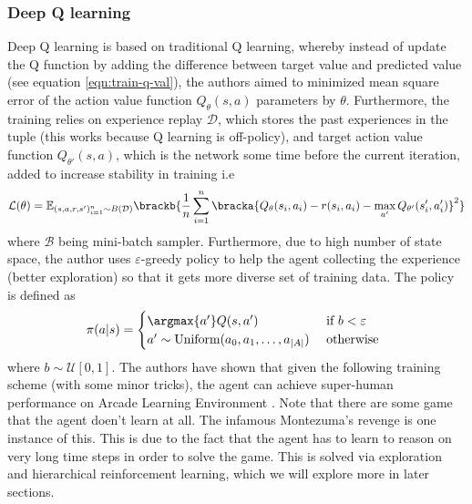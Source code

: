 \subsubsection{Deep Q learning \cite{mnih2015human}}
Deep Q learning is based on traditional Q learning, whereby instead of update the Q function by adding the difference between target value and predicted value (see equation \ref{eqn:train-q-val}), the authors aimed to minimized mean square error of the action value function $Q_\theta(s, a)$ parameters by $\theta$. Furthermore, the training relies on experience replay $\mathcal{D}$, which stores the past experiences in the tuple (this works because Q learning is off-policy), and target action value function $Q_{\theta'}(s, a)$, which is the network some time before the current iteration, added to increase stability in training i.e
\begin{equation}
    \mathcal{L}(\theta) = \mathbb{E}_{(s, a, r, s')^n_{i=1} \sim B(\mathcal{D})}\brackb{ \frac{1}{n}\sum^n_{i=1} \bracka{Q_{\theta}(s_i, a_i) - r(s_i, a_i) - \max_{a'} Q_{\theta'}(s'_i, a'_i)}^2 }
\end{equation}
where $\mathcal{B}$ being mini-batch sampler. Furthermore, due to high number of state space, the author uses $\varepsilon$-greedy policy to help the agent collecting the experience (better exploration) so that it gets more diverse set of training data. The policy is defined as 
\begin{equation}
    \pi(a | s) = \begin{cases}
        \argmax{a'} Q(s, a') &\text{ if } b < \varepsilon \\
        a' \sim \text{Uniform}(a_0, a_1, \dots, a_{|A|}) &\text{ otherwise } \\
    \end{cases} \\
\end{equation}
where $b \sim \mathcal{U}[0, 1]$. The authors have shown that given the following training scheme (with some minor tricks), the agent can achieve super-human performance on Arcade Learning Environment \cite{bellemare2013arcade}. Note that there are some game that the agent doen't learn at all. The infamous Montezuma's revenge is one instance of this. This is due to the fact that the agent has to learn to reason on very long time steps in order to solve the game. This is solved via exploration and hierarchical reinforcement learning, which we will explore more in later sections.

